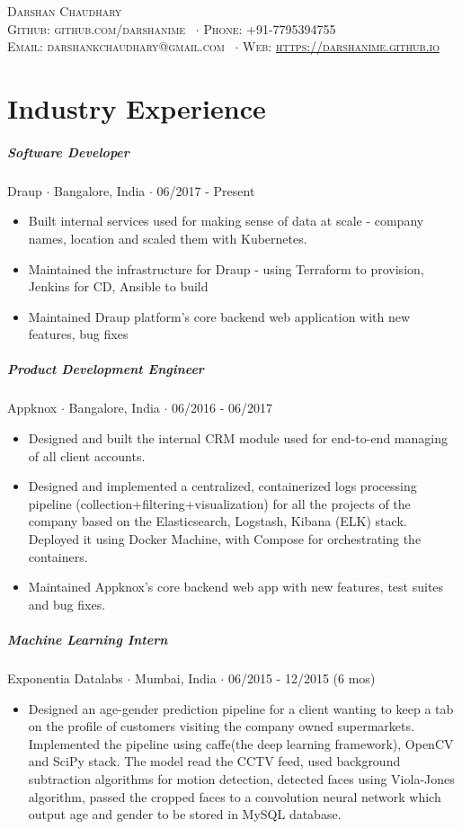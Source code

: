 \documentclass[10pt,letterpaper]{article}
\newcommand{\namestyle}{\Huge \scshape}
\newcommand{\addressstyle}{\color{addresscolor} \footnotesize \rmfamily \upshape}
\begin{document}
\begin{center}
    \namestyle Darshan Chaudhary \\[0.3em]
    \addressstyle Github: github.com/darshanime \ $\cdot$ Phone: +91-7795394755\\
    Email: darshankchaudhary@gmail.com \ $\cdot$ Web: \url{https://darshanime.github.io}
\end{center}

\small


\section*{Industry Experience}

\subparagraph{Software Developer}
Draup $\cdot$ Bangalore, India $\cdot$ 06/2017 - Present
\begin{itemize}
    \item Built internal services used for making sense of data at scale - company names, location and scaled them with Kubernetes.
    \item Maintained the infrastructure for Draup - using Terraform to provision, Jenkins for CD, Ansible to build
    \item Maintained Draup platform's core backend web application with new features, bug fixes
\end{itemize}

\subparagraph{Product Development Engineer}
Appknox $\cdot$ Bangalore, India $\cdot$ 06/2016 - 06/2017
\begin{itemize}
    \item Designed and built the internal CRM module used for end-to-end managing of all client accounts.
    \item Designed and implemented a centralized, containerized logs processing pipeline (collection+filtering+visualization) for all the projects of the company based on the Elasticsearch, Logstash, Kibana (ELK) stack. Deployed it using Docker Machine, with Compose for orchestrating the containers.
    \item Maintained Appknox's core backend web app with new features, test suites and bug fixes.
\end{itemize}

\subparagraph{Machine Learning Intern}
Exponentia Datalabs $\cdot$ Mumbai, India $\cdot$ 06/2015 - 12/2015 (6 mos)
\begin{itemize}
    \item Designed an age-gender prediction pipeline for a client wanting to keep a tab on the profile of customers visiting the company owned supermarkets. Implemented the pipeline using caffe(the deep learning framework), OpenCV and SciPy stack. The model read the CCTV feed, used background subtraction algorithms for motion detection, detected faces using Viola-Jones algorithm, passed the cropped faces to a convolution neural network which output age and gender to be stored in MySQL database.
\end{itemize}
\end{document}
